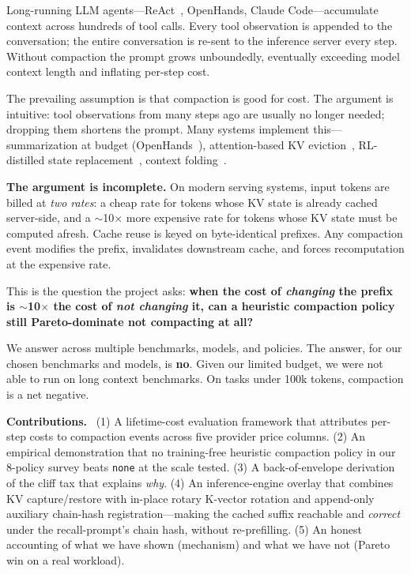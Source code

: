 \documentclass[letterpaper,twocolumn,10pt]{article}
\newcommand{\para}[1]{\smallskip\noindent\textbf{#1.}\ }
\begin{document}
Long-running LLM agents---ReAct~\cite{yao2023react}, OpenHands, Claude
Code---accumulate context across hundreds of tool calls. Every tool
observation is appended to the conversation; the entire conversation
is re-sent to the inference server every step. Without compaction the
prompt grows unboundedly, eventually exceeding model context length
and inflating per-step cost.

The prevailing assumption is that compaction is good for cost. The
argument is intuitive: tool observations from many steps ago are
usually no longer needed; dropping them shortens the prompt. Many
systems implement this---summarization at budget
(OpenHands~\cite{openhands2025}), attention-based KV
eviction~\cite{zhang2023h2o,xiao2024streamingllm,li2024snapkv},
RL-distilled state replacement~\cite{zhou2025mem1,yu2025memagent},
context folding~\cite{sun2025contextfolding}.

\textbf{The argument is incomplete.} On modern serving systems, input
tokens are billed at \emph{two rates}: a cheap rate for tokens whose
KV state is already cached server-side, and a $\sim$10$\times$ more
expensive rate for tokens whose KV state must be computed afresh.
Cache reuse is keyed on byte-identical prefixes. Any compaction
event modifies the prefix, invalidates downstream cache, and forces
recomputation at the expensive rate.

This is the question the project asks: \textbf{when the cost of
\emph{changing} the prefix is $\sim$10$\times$ the cost of \emph{not
changing} it, can a heuristic compaction policy still Pareto-dominate
not compacting at all?}

\noindent We answer across multiple benchmarks, models, and policies.
The answer, for our chosen benchmarks and models, is \textbf{no}. Given our limited budget, we were not able to run on long context benchmarks. On tasks under 100k tokens, compaction is a net negative.

\para{Contributions} (1) A lifetime-cost evaluation framework that
attributes per-step costs to compaction events across five provider
price columns. (2) An empirical demonstration that no training-free
heuristic compaction policy in our 8-policy survey beats
\texttt{none} at the scale tested. (3) A back-of-envelope
derivation of the cliff tax that explains \emph{why}. (4) An
inference-engine overlay that combines KV capture/restore with
in-place rotary K-vector rotation and append-only auxiliary
chain-hash registration---making the cached suffix reachable and
\emph{correct} under the recall-prompt's chain hash, without
re-prefilling. (5) An honest accounting of what we have shown
(mechanism) and what we have not (Pareto win on a real workload).
\end{document}
